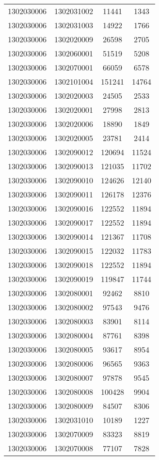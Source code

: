 \begin{longtable}{llcc}
1302030006 & 1302031002 & 11441 & 1343\\
1302030006 & 1302031003 & 14922 & 1766\\
1302030006 & 1302020009 & 26598 & 2705\\
1302030006 & 1302060001 & 51519 & 5208\\
1302030006 & 1302070001 & 66059 & 6578\\
1302030006 & 1302101004 & 151241 & 14764\\
1302030006 & 1302020003 & 24505 & 2533\\
1302030006 & 1302020001 & 27998 & 2813\\
1302030006 & 1302020006 & 18890 & 1849\\
1302030006 & 1302020005 & 23781 & 2414\\
1302030006 & 1302090012 & 120694 & 11524\\
1302030006 & 1302090013 & 121035 & 11702\\
1302030006 & 1302090010 & 124626 & 12140\\
1302030006 & 1302090011 & 126178 & 12376\\
1302030006 & 1302090016 & 122552 & 11894\\
1302030006 & 1302090017 & 122552 & 11894\\
1302030006 & 1302090014 & 121367 & 11708\\
1302030006 & 1302090015 & 122032 & 11783\\
1302030006 & 1302090018 & 122552 & 11894\\
1302030006 & 1302090019 & 119847 & 11744\\
1302030006 & 1302080001 & 92462 & 8810\\
1302030006 & 1302080002 & 97543 & 9476\\
1302030006 & 1302080003 & 83901 & 8114\\
1302030006 & 1302080004 & 87761 & 8398\\
1302030006 & 1302080005 & 93617 & 8954\\
1302030006 & 1302080006 & 96565 & 9363\\
1302030006 & 1302080007 & 97878 & 9545\\
1302030006 & 1302080008 & 100428 & 9904\\
1302030006 & 1302080009 & 84507 & 8306\\
1302030006 & 1302031010 & 10189 & 1227\\
1302030006 & 1302070009 & 83323 & 8819\\
1302030006 & 1302070008 & 77107 & 7828\\

\end{longtable}
